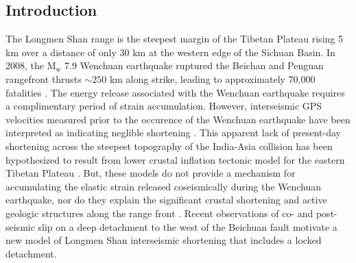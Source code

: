 \documentclass[draft,jgrga]{agutex}
\begin{document}
\begin{article}

%
%

\section{Introduction}

The Longmen Shan range is the steepest margin of the Tibetan Plateau rising 5 km over a distance of only 30 km at the western edge of the Sichuan Basin. In 2008, the $\textrm{M}_{\textrm{w}}$ 7.9 Wenchuan earthquake ruptured the Beichan and Penguan rangefront thrusts ${\sim}250$ km along strike, leading to approximately 70,000 fatalities \citep{Hubbard2009, Xu2009, Lin2009}. The energy release associated with the Wenchuan earthquake requires a complimentary period of strain accumulation. However, interseismic GPS velocities measured prior to the occurence of the Wenchuan earthquake have been interpreted as indicating neglible shortening \citep{king97, chen00, shen05, Meade07c, Loveless2011}. This apparent lack of present-day shortening across the steepest topography of the India-Asia collision has been hypothesized to result from lower crustal inflation tectonic model for the eastern Tibetan Plateau \citep{royden97, bird91, Burchfiel2008, Clark2000}. But, these models do not provide a mechanism for accumulating the elastic strain released coseismically during the Wenchuan earthquake, nor do they explain the significant crustal shortening and active geologic structures along the range front \citep{Hubbard2010, Li2010a, Wang2013, Wang2014}. Recent observations of co- and post-seismic slip on a deep detachment to the west of the Beichuan fault\citep{Qi2011, Fielding2013b} motivate a new model of Longmen Shan interseismic shortening that includes a locked detachment.


\end{article}
\end{document}
